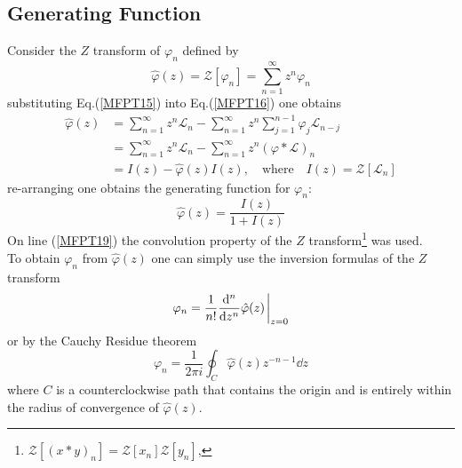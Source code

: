 \documentclass{article}
\numberwithin{equation}{section}
\newcommand{\1}{\mathbb{1}}
\newcommand{\zphi}{\hat{\varphi}(z)}
\begin{document}
\subsection{Generating Function}
Consider the $Z$ transform of $\varphi_n$ defined by
\begin{equation}\label{MFPT16}
    \zphi=\mathcal{Z}[\varphi_n]=\sum_{n=1}^\infty z^{n}\varphi_n
\end{equation}
substituting Eq.(\ref{MFPT15}) into Eq.(\ref{MFPT16}) one obtains 
\begin{align}
\zphi&=\sum_{n=1}^\infty z^{n}\mathcal{L}_n-\sum_{n=1}^{\infty}z^{n}\sum_{j=1}^{n-1}\varphi_j\mathcal{L}_{n-j}
\\
&=\sum_{n=1}^\infty z^{n}\mathcal{L}_n-\sum_{n=1}^{\infty}z^{n}(\varphi * \mathcal{L})_n
\\
&=I(z)-\zphi I(z), \quad \text{where} \quad I(z)=\mathcal{Z}[\mathcal{L}_n] \label{MFPT19}
\end{align}
re-arranging one obtains the generating function for $\varphi_n$:
\begin{equation}\label{MFPT20}
    \zphi=\frac{I(z)}{1+I(z)}
\end{equation}
On line (\ref{MFPT19}) the convolution property of the $Z$ transform\footnote{ $\mathcal{Z} [(x * y)_n]=\mathcal{Z}[x_n]\mathcal{Z}[y_n]$, } was used.
\\
To obtain $\varphi_n$ from $\zphi$ one can simply use the inversion formulas of the $Z$ transform
\begin{equation}
    \varphi_n=\frac{1}{n!}\dv[n]{z}\zphi\eval_{z=0}
\end{equation}
or by the Cauchy Residue theorem
\begin{equation}
    \varphi_n=\frac{1}{2\pi i}\oint_C \zphi z^{-n-1} \dd{z}
\end{equation}
where $C$ is a counterclockwise path that contains the origin and is entirely within the radius of convergence of $\zphi$.
\end{document}
